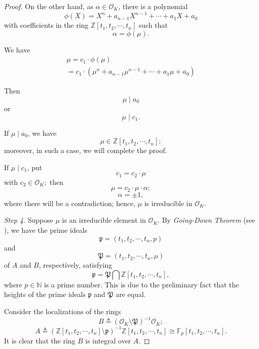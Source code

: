 \documentclass{amsart}
\theoremstyle{definition}
\numberwithin{equation}{section}
\begin{document}
\begin{proof}
On the other hand, as $\alpha\in \mathcal{O}_{K}$, there is a polynomial $$\phi(X)=X^{n}+a_{n-1}X^{n-1}+\cdots+a_{1}X+a_{0}$$ with coefficients in the ring $\mathbb{Z}[t_{1},t_{2},\cdots,t_{n}]$ such that $$\alpha=\phi(\mu).$$

We have
\begin{equation*}
\begin{array}{l}
\mu=c_{1}\cdot \phi(\mu)\\

=c_{1}\cdot (\mu^{n}+a_{n-1}\mu^{n-1}+\cdots+a_{1}\mu+a_{0})
\end{array}
\end{equation*}

Then $$\mu\mid a_{0}$$ or $$\mu\mid c_{1}.$$

If $\mu\mid a_{0}$, we have $$\mu\in \mathbb{Z}[t_{1},t_{2},\cdots,t_{n}];$$ moreover, in such a case, we will complete the proof.

If $\mu\mid c_{1}$, put  $$c_{1}=c_{2}\cdot \mu$$ with $c_{2}\in\mathcal{O}_{K};$ then $$\mu=c_{2}\cdot \mu\cdot\alpha;$$
$$\alpha=\pm 1,$$
where there will be a contradiction; hence, $\mu$ is irreducible in $\mathcal{O}_{K}$.

\emph{Step 4.} Suppose $\mu$ is an irreducible element in $\mathcal{O}_{K}$. By \emph{Going-Down Theorem} (see \cite{bourbaki}), we have the
prime ideals
\begin{equation*}
\mathfrak{p}=(t_{1},t_{2},\cdots,t_{n},p)
\end{equation*}
and
\begin{equation*}
\mathfrak{P}=(t_{1},t_{2},\cdots,t_{n},\mu)
\end{equation*}
of $A$ and $B$, respectively, satisfying
\begin{equation*}
\mathfrak{p}=\mathfrak{P}\bigcap \mathbb{Z}[t_{1},t_{2},\cdots,t_{n}],
\end{equation*}
where $p \in \mathbb{N}$ is a prime number. This is due to the preliminary fact that the heights of the prime ideals $\mathfrak{p}$ and $\mathfrak{P}$ are equal.

Consider the localizations of the rings
\begin{equation*}
B\triangleq(\mathcal{O}_{K}\setminus \mathfrak{P})^{-1}\mathcal{O}_{K};
\end{equation*}
\begin{equation*}
A\triangleq(\mathbb{Z}[t_{1},t_{2},\cdots,t_{n}]\setminus \mathfrak{p})^{-1}\mathbb{Z}[t_{1},t_{2},\cdots,t_{n}]\cong\mathbb{F}_{p}[t_{1},t_{2},\cdots,t_{n}].
\end{equation*}
It is clear that the ring $B$ is integral over $A$.


\end{proof}
\end{document}
